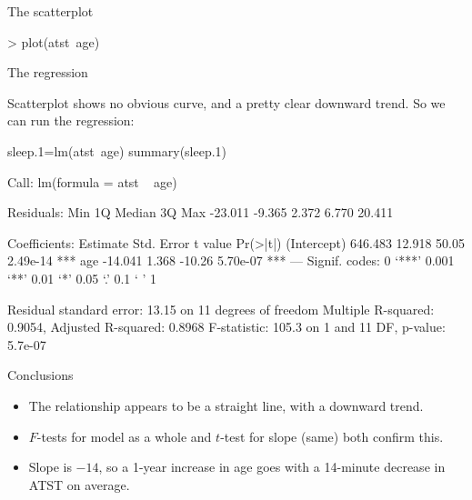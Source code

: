 \begin{frame}[fragile]{The scatterplot}

\begin{Schunk}
\begin{Sinput}
> plot(atst~age)
\end{Sinput}
\end{Schunk}
  
  

\end{frame}

\begin{frame}[fragile]{The regression}

Scatterplot shows no obvious curve, and a pretty clear downward trend. So we can run the regression:

{\scriptsize
\begin{semiverbatim}
sleep.1=lm(atst~age)
summary(sleep.1)

Call:
lm(formula = atst ~ age)

Residuals:
    Min      1Q  Median      3Q     Max 
-23.011  -9.365   2.372   6.770  20.411 

Coefficients:
            Estimate Std. Error t value Pr(>|t|)    
(Intercept)  646.483     12.918   50.05 2.49e-14 ***
age          -14.041      1.368  -10.26 5.70e-07 ***
---
Signif. codes:  0 ‘***’ 0.001 ‘**’ 0.01 ‘*’ 0.05 ‘.’ 0.1 ‘ ’ 1 

Residual standard error: 13.15 on 11 degrees of freedom
Multiple R-squared: 0.9054,	Adjusted R-squared: 0.8968 
F-statistic: 105.3 on 1 and 11 DF,  p-value: 5.7e-07 
\end{semiverbatim}
}

\end{frame}

\begin{frame}{Conclusions}

    \begin{itemize}
  \item The relationship appears to be a straight line, with a downward trend.
  \item $F$-tests for model as a whole and $t$-test for slope (same) both confirm this.
  \item Slope is $-14$, so a 1-year increase in age goes with a 14-minute decrease in ATST on average.
  \end{itemize}
  
\end{frame}

% 
% 
% 


